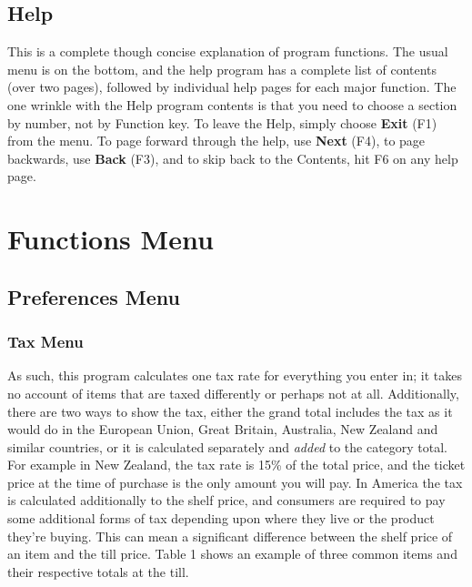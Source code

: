 \documentclass[]{article}
\begin{document}
\subsection{Help}
This is a complete though concise explanation of program functions. The usual menu
is on the bottom, and the help program has a complete list of contents (over two pages),
followed by individual help pages for each major function. The one wrinkle with the
Help program contents is that you need to choose a section by number, not by Function key.
To leave the Help, simply choose {\bf Exit} (F1) from the menu. To page forward through
the help, use {\bf Next} (F4), to page backwards, use {\bf Back} (F3), and to skip back
to the Contents, hit F6 on any help page.
\section[Functions]{Functions Menu}
\subsection[Preferences]{Preferences Menu}

\subsubsection[Tax]{Tax Menu}
As such, this program calculates one tax rate for everything you enter in; it takes no
account of items that are taxed differently or perhaps not at all. Additionally, there
are two ways to show the tax, either the grand total includes the tax as it would do in
the European Union, Great Britain, Australia, New Zealand and similar countries, or it
is calculated separately and {\it added} to the category total. For example in New Zealand,
the tax rate is 15\% of the total price, and the ticket price at the time of purchase is
the only amount you will pay. In America the tax is calculated additionally to the shelf
price, and consumers are required to pay some additional forms of tax depending upon where
they live or the product they're buying. This can mean a significant difference between the shelf price of an item and
the till price. Table 1 shows an example of three common items and their respective
totals at the till.
\end{document}

